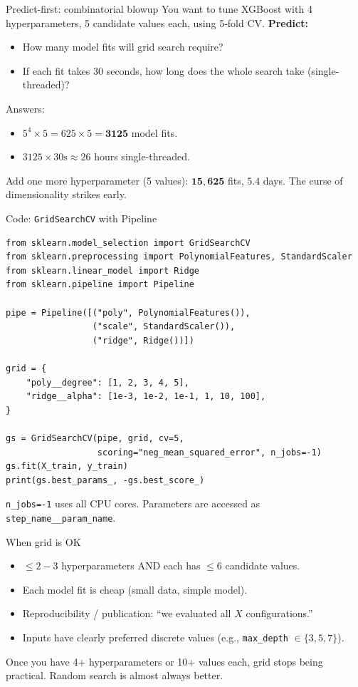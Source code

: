 \documentclass[aspectratio=169]{beamer}
\begin{document}
\begin{frame}{Predict-first: combinatorial blowup}
  You want to tune XGBoost with 4 hyperparameters, 5 candidate values each, using 5-fold CV.
  \vfill
  \pause
  \textbf{Predict:}
  \begin{itemize}
    \item How many model fits will grid search require?
    \item If each fit takes 30 seconds, how long does the whole search take (single-threaded)?
  \end{itemize}
  \vfill
  \pause
  Answers:
  \begin{itemize}
    \item $5^4 \times 5 = 625 \times 5 = \mathbf{3125}$ model fits.
    \item $3125 \times 30\text{s} \approx 26$ hours single-threaded.
  \end{itemize}
  \vfill
  Add one more hyperparameter (5 values): $\mathbf{15{,}625}$ fits, $\mathbf{5.4}$ days. The curse of dimensionality strikes early.
\end{frame}

\begin{frame}[fragile]{Code: \texttt{GridSearchCV} with Pipeline}
\begin{lstlisting}
from sklearn.model_selection import GridSearchCV
from sklearn.preprocessing import PolynomialFeatures, StandardScaler
from sklearn.linear_model import Ridge
from sklearn.pipeline import Pipeline

pipe = Pipeline([("poly", PolynomialFeatures()),
                 ("scale", StandardScaler()),
                 ("ridge", Ridge())])

grid = {
    "poly__degree": [1, 2, 3, 4, 5],
    "ridge__alpha": [1e-3, 1e-2, 1e-1, 1, 10, 100],
}

gs = GridSearchCV(pipe, grid, cv=5,
                  scoring="neg_mean_squared_error", n_jobs=-1)
gs.fit(X_train, y_train)
print(gs.best_params_, -gs.best_score_)
\end{lstlisting}
  \vfill
  \footnotesize \texttt{n\_jobs=-1} uses all CPU cores. Parameters are accessed as \texttt{step\_name\_\_param\_name}.
\end{frame}

\begin{frame}{When grid is OK}
  \begin{itemize}
    \item $\leq 2{-}3$ hyperparameters AND each has $\leq 6$ candidate values.
    \item Each model fit is cheap (small data, simple model).
    \item Reproducibility / publication: ``we evaluated all $X$ configurations.''
    \item Inputs have clearly preferred discrete values (e.g., \texttt{max\_depth} $\in \{3, 5, 7\}$).
  \end{itemize}
  \vfill
  Once you have 4+ hyperparameters or 10+ values each, grid stops being practical. Random search is almost always better.
\end{frame}
\end{document}
